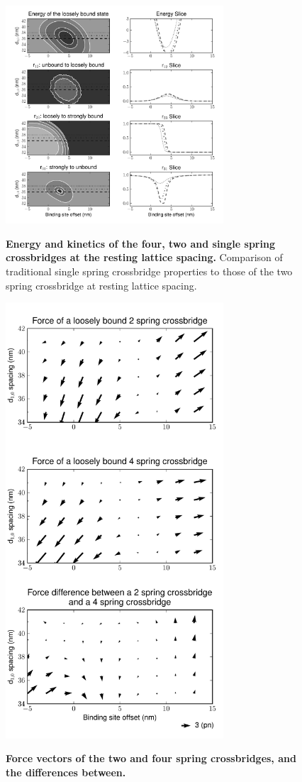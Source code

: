 \documentclass[]{article}
\begin{document}
\begin{figure}[htbp]
    \begin{center}
    \includegraphics[width=3.2in]{../imgs/Figure3.pdf}
    \label{kinetics_cuts}
    \caption{
        \textbf{Energy and kinetics of the four, two and single spring crossbridges at the resting lattice spacing.}
        Comparison of traditional single spring crossbridge properties to those of the two spring crossbridge at resting lattice spacing.
    }
    \end{center}
\end{figure}

\begin{figure}[htbp]
    \begin{center}
    \includegraphics[width=3.2in]{../imgs/Figure4.pdf}
    \label{force_vectors}
    \caption{
        \textbf{Force vectors of the two and four spring crossbridges, and the differences between.}        
    }
    \end{center}
\end{figure}
\end{document}
